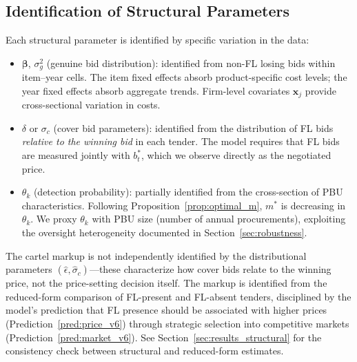 
\subsection{Identification of Structural Parameters}
\label{sec:identification}

Each structural parameter is identified by specific variation in the
data:

\begin{itemize}
  \item $\boldsymbol{\beta}$, $\sigma_g^2$ (genuine bid distribution):
    identified from non-FL losing bids within item--year cells.
    The item fixed effects absorb product-specific cost levels; the year
    fixed effects absorb aggregate trends. Firm-level covariates
    $\mathbf{x}_j$ provide cross-sectional variation in costs.

  \item $\delta$ or $\sigma_c$ (cover bid parameters): identified from
    the distribution of FL bids \emph{relative to the winning bid} in
    each tender. The model requires that FL bids are measured jointly
    with $b^*_t$, which we observe directly as the negotiated price.

  \item $\theta_k$ (detection probability): partially identified from
    the cross-section of PBU characteristics. Following
    Proposition~\ref{prop:optimal_m}, $m^*$ is decreasing in
    $\theta_k$. We proxy $\theta_k$ with PBU size (number of annual
    procurements), exploiting the oversight heterogeneity
    documented in Section~\ref{sec:robustness}.
\end{itemize}

\noindent The cartel markup is not independently identified by the
distributional parameters $(\hat{\epsilon}, \hat{\sigma}_c)$---these
characterize how cover bids relate to the winning price, not the
price-setting decision itself. The markup is identified from the
reduced-form comparison of FL-present and FL-absent tenders, disciplined
by the model's prediction that FL presence should be associated with
higher prices (Prediction~\ref{pred:price_v6}) through strategic
selection into competitive markets (Prediction~\ref{pred:market_v6}).
See Section~\ref{sec:results_structural} for the consistency check
between structural and reduced-form estimates.


